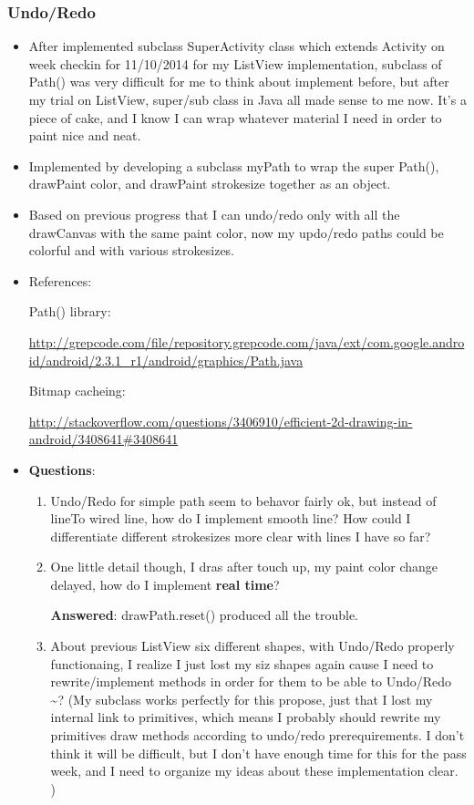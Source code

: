 \documentclass[9pt,b5paper]{article}
\begin{document}
\subsubsection{Undo/Redo}
\label{sec-4-2-2}
\begin{itemize}
\item After implemented subclass SuperActivity class which extends Activity on week checkin for 11/10/2014 for my ListView implementation, subclass of Path() was very difficult for me to think about implement before, but after my trial on ListView, super/sub class in Java all made sense to me now. It's a piece of cake, and I know I can wrap whatever material I need in order to paint nice and neat.
\item Implemented by developing a subclass myPath to wrap the super Path(), drawPaint color, and drawPaint strokesize together as an object.
\item Based on previous progress that I can undo/redo only with all the drawCanvas with the same paint color, now my updo/redo paths could be colorful and with various strokesizes.
\item References:

Path() library:

\url{http://grepcode.com/file/repository.grepcode.com/java/ext/com.google.android/android/2.3.1_r1/android/graphics/Path.java}

Bitmap cacheing:

\url{http://stackoverflow.com/questions/3406910/efficient-2d-drawing-in-android/3408641#3408641}

\item \textbf{Questions}: 

\begin{enumerate}
\item Undo/Redo for simple path seem to behavor fairly ok, but instead of lineTo wired line, how do I implement smooth line? How could I differentiate different strokesizes more clear with lines I have so far?

\item One little detail though, I dras after touch up, my paint color change delayed, how do I implement \textbf{real time}?

\textbf{Answered}: drawPath.reset() produced all the trouble.

\item About previous ListView six different shapes, with Undo/Redo properly functionaing, I realize I just lost my siz shapes again cause I need to rewrite/implement methods in order for them to be able to Undo/Redo \textasciitilde{}? (My subclass works perfectly for this propose, just that I lost my internal link to primitives, which means I probably should rewrite my primitives draw methods according to undo/redo prerequirements. I don't think it will be difficult, but I don't have enough time for this for the pass week, and I need to organize my ideas about these implementation clear. )


\end{enumerate}
\end{itemize}
\end{document}
